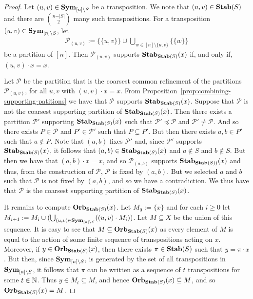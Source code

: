 \documentclass[../main/thesis.tex]{subfiles}
\begin{document}
\begin{proof}
  Let $(u, v) \in \text{\textbf{Sym}}_{[n] \setminus S}$ be a transposition. We note that
  $(u,v) \in \text{\textbf{Stab}}(S)$ and there are ${n - \vert S \vert}\choose{2}$ many such
  transpositions. For a transposition $(u, v) \in \text{\textbf{Sym}}_{[n] \setminus S}$, let
  \begin{align*}
    \mathcal{P}_{(u,v)} := \{ \{u,v\}\} \cup \bigcup_{w \in [n] \setminus \{ u,v \}} \{ \{ w \} \}
  \end{align*}
  be a partition of $[n]$. Then $\mathcal{P}_{(u,v)}$ supports
  $\text{\textbf{Stab}}_{\text{\textbf{Stab}}(S)}(x)$ if, and only if, $(u,v) \cdot x = x$.

  Let $\mathcal{P}$ be the partition that is the coarsest common refinement of
  the partitions $\mathcal{P}_{(u,v)}$, for all $u,v$ with $(u,v) \cdot x = x$.
  From Proposition~\ref{prop:combining-supporting-patitions} we have that
  $\mathcal{P}$ supports $\text{\textbf{Stab}}_{\text{\textbf{Stab}}(S)}(x)$. Suppose that $\mathcal{P}$ is
  not the coarsest supporting partition of $\text{\textbf{Stab}}_{\text{\textbf{Stab}}(S)}(x)$. Then there
  exists a partition $\mathcal{P}'$ supporting $\text{\textbf{Stab}}_{\text{\textbf{Stab}}(S)}(x)$ such that
  $\mathcal{P}' \preceq \mathcal{P}$ and $\mathcal{P}' \neq \mathcal{P}$. And so
  there exists $P \in \mathcal{P}$ and $P' \in \mathcal{P}'$ such that $P
  \subsetneq P'$. But then there exists $a , b \in P'$ such that $a \not\in P$.
  Note that $(a,b)$ fixes $\mathcal{P}'$ and, since $\mathcal{P}'$ supports
  $\text{\textbf{Stab}}_{\text{\textbf{Stab}}(S)}(x)$, it follows that $(a,b) \in \text{\textbf{Stab}}_{\text{\textbf{Stab}}(S)}(x)$ and $a
  \not\in S$ and $b \not\in S$. But then we have that $(a,b) \cdot x = x$, and
  so $\mathcal{P}_{(a,b)}$ supports $\text{\textbf{Stab}}_{\text{\textbf{Stab}}(S))}(x)$ and thus, from the
  construction of $\mathcal{P}$, $\mathcal{P}$ is fixed by $(a,b)$. But we
  selected $a$ and $b$ such that $\mathcal{P}$ is not fixed by $(a,b)$, and so
  we have a contradiction. We thus have that $\mathcal{P}$ is the coarsest
  supporting partition of $\text{\textbf{Stab}}_{\text{\textbf{Stab}}(S)}(x)$.

  It remains to compute $\text{\textbf{Orb}}_{\text{\textbf{Stab}}(S)}(x)$. Let $M_0 := \{x\}$ and for each $i
  \geq 0$ let $M_{i+1} := M_i\cup (\bigcup_{(u,v) \in \text{\textbf{Sym}}_{[n] \setminus S}}
  ((u,v) \cdot M_i))$. Let $M \subseteq X$ be the union of this sequence. It is
  easy to see that $M \subseteq \text{\textbf{Orb}}_{\text{\textbf{Stab}}(S)}(x)$ as every element of $M$ is
  equal to the action of some finite sequence of transpositions acting on $x$.
  Moreover, if $y \in \text{\textbf{Orb}}_{\text{\textbf{Stab}}(S)}(x)$, then there exists $\pi \in \text{\textbf{Stab}}(S)$
  such that $y = \pi \cdot x$. But then, since $\text{\textbf{Sym}}_{[n] \setminus S}$, is
  generated by the set of all transpositions in $\text{\textbf{Sym}}_{[n] \setminus S}$, it
  follows that $\pi$ can be written as a sequence of $t$ transpositions for some
  $t \in \mathbb{N}$. Thus $y \in M_t \subseteq M$, and hence $\text{\textbf{Orb}}_{\text{\textbf{Stab}}(S)}(x)
  \subseteq M$, and so $\text{\textbf{Orb}}_{\text{\textbf{Stab}}(S)}(x) = M$.


\end{proof}
\end{document}
